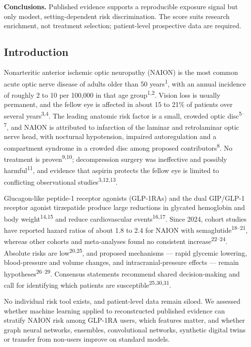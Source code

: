 \documentclass[
  11pt,
]{article}
\begin{document}
\textbf{Conclusions.} Published evidence supports a reproducible
exposure signal but only modest, setting-dependent risk discrimination.
The score suits research enrichment, not treatment selection;
patient-level prospective data are required.

\subsection{Introduction}\label{introduction}

Nonarteritic anterior ischemic optic neuropathy (NAION) is the most
common acute optic nerve disease of adults older than 50
years\textsuperscript{1}, with an annual incidence of roughly 2 to 10
per 100,000 in that age group\textsuperscript{1,2}. Vision loss is
usually permanent, and the fellow eye is affected in about 15 to 21\% of
patients over several years\textsuperscript{3,4}. The leading anatomic
risk factor is a small, crowded optic disc\textsuperscript{5--7}, and
NAION is attributed to infarction of the laminar and retrolaminar optic
nerve head, with nocturnal hypotension, impaired autoregulation and a
compartment syndrome in a crowded disc among proposed
contributors\textsuperscript{8}. No treatment is
proven\textsuperscript{9,10}; decompression surgery was ineffective and
possibly harmful\textsuperscript{11}, and evidence that aspirin protects
the fellow eye is limited to conflicting observational
studies\textsuperscript{3,12,13}.

Glucagon-like peptide-1 receptor agonists (GLP-1RAs) and the dual
GIP/GLP-1 receptor agonist tirzepatide produce large reductions in
glycated hemoglobin and body weight\textsuperscript{14,15} and reduce
cardiovascular events\textsuperscript{16,17}. Since 2024, cohort studies
have reported hazard ratios of about 1.8 to 2.4 for NAION with
semaglutide\textsuperscript{18--21}, whereas other cohorts and
meta-analyses found no consistent increase\textsuperscript{22--24}.
Absolute risks are low\textsuperscript{20,25}, and proposed mechanisms
--- rapid glycemic lowering, blood-pressure and volume changes, and
intracranial-pressure effects --- remain
hypotheses\textsuperscript{26--29}. Consensus statements recommend
shared decision-making and call for identifying which patients are
susceptible\textsuperscript{25,30,31}.

No individual risk tool exists, and patient-level data remain siloed. We
assessed whether machine learning applied to reconstructed published
evidence can stratify NAION risk among GLP-1RA users, which features
matter, and whether graph neural networks, ensembles, convolutional
networks, synthetic digital twins or transfer from non-users improve on
standard models.
\end{document}
